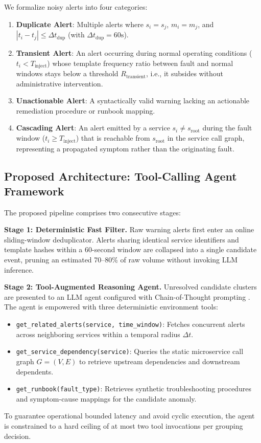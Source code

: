 \documentclass[conference]{IEEEtran}
\begin{document}
We formalize noisy alerts into four categories:
\begin{enumerate}
    \item \textbf{Duplicate Alert}: Multiple alerts where $s_i = s_j$, $m_i = m_j$, and $|t_i - t_j| \le \Delta t_{\text{dup}}$ (with $\Delta t_{\text{dup}} = 60\text{s}$).
    \item \textbf{Transient Alert}: An alert occurring during normal operating conditions ($t_i < T_{\text{inject}}$) whose template frequency ratio between fault and normal windows stays below a threshold $R_{\text{transient}}$, i.e., it subsides without administrative intervention.
    \item \textbf{Unactionable Alert}: A syntactically valid warning lacking an actionable remediation procedure or runbook mapping.
    \item \textbf{Cascading Alert}: An alert emitted by a service $s_i \neq s_{\text{root}}$ during the fault window ($t_i \ge T_{\text{inject}}$) that is reachable from $s_{\text{root}}$ in the service call graph, representing a propagated symptom rather than the originating fault.
\end{enumerate}

\subsection{Proposed Architecture: Tool-Calling Agent Framework}
The proposed pipeline comprises two consecutive stages:

\textbf{Stage 1: Deterministic Fast Filter.} Raw warning alerts first enter an online sliding-window deduplicator. Alerts sharing identical service identifiers and template hashes within a 60-second window are collapsed into a single candidate event, pruning an estimated 70--80\% of raw volume without invoking LLM inference.

\textbf{Stage 2: Tool-Augmented Reasoning Agent.} Unresolved candidate clusters are presented to an LLM agent configured with Chain-of-Thought prompting \cite{wei2022cot}. The agent is empowered with three deterministic environment tools:
\begin{itemize}
    \item \texttt{get\_related\_alerts(service, time\_window)}: Fetches concurrent alerts across neighboring services within a temporal radius $\Delta t$.
    \item \texttt{get\_service\_dependency(service)}: Queries the static microservice call graph $G=(V, E)$ to retrieve upstream dependencies and downstream dependents.
    \item \texttt{get\_runbook(fault\_type)}: Retrieves synthetic troubleshooting procedures and symptom-cause mappings for the candidate anomaly.
\end{itemize}
To guarantee operational bounded latency and avoid cyclic execution, the agent is constrained to a hard ceiling of at most two tool invocations per grouping decision.
\end{document}
